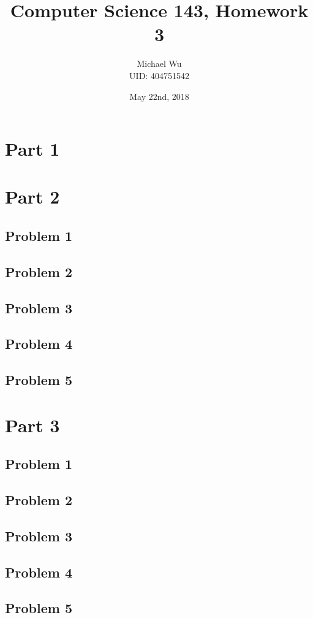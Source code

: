 \documentclass[12pt]{article}
\begin{document}
\title{Computer Science 143, Homework 3}
\date{May 22nd, 2018}
\author{Michael Wu\\UID: 404751542}
\maketitle

\section*{Part 1}

\section*{Part 2}

\subsection*{Problem 1}

\subsection*{Problem 2}

\subsection*{Problem 3}

\subsection*{Problem 4}

\subsection*{Problem 5}

\section*{Part 3}

\subsection*{Problem 1}

\subsection*{Problem 2}

\subsection*{Problem 3}

\subsection*{Problem 4}

\subsection*{Problem 5}
\end{document}
